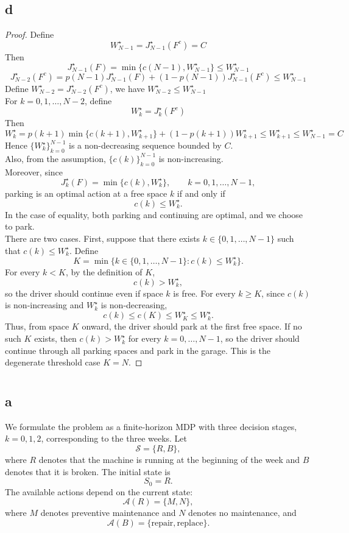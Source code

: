 \documentclass{article}
\begin{document}
\subsection*{d}
\begin{proof}
Define \[W^{\star}_{N-1}=J^{\star}_{N-1}(F^c)=C\]
Then \[J^{\star}_{N-1}(F)=\min \{c(N-1),W^{\star}_{N-1}\} \leq W^{\star}_{N-1}\]
\[J^{\star}_{N-2}(F^c)=p(N-1)J^{\star}_{N-1}(F) + (1-p(N-1)) J^{\star}_{N-1}(F^c)\leq W^{\star} _{N-1}\]
Define $W^{\star}_{N-2}=J^{\star}_{N-2}(F^c)$, we have $W^{\star}_{N-2} \leq W^{\star} _{N-1}$\\
For $k=0,1,\ldots, {N-2}$, define
\[W^{\star}_{k} = J^{\star}_{k}(F^c)\]
Then \[W^{\star}_{k} = p(k+1) \min \{c(k+1), W^{\star}_{k+1}\}+(1-p(k+1))W^{\star}_{k+1} \leq W^{\star}_{k+1}\leq W^{\star}_{N-1}=C\]
Hence $\{W^{\star}_k\}_{k=0}^{N-1}$ is a non-decreasing sequence bounded by $C$.\\
Also, from the assumption, $\{c(k)\}_{k=0}^{N-1}$ is non-increasing.\\
Moreover, since \[J_k^\star(F)=\min\{c(k),W_k^\star\}, \qquad k=0,1,\ldots,N-1,\]
parking is an optimal action at a free space $k$ if and only if
\[c(k)\leq W_k^\star.\]
In the case of equality, both parking and continuing are optimal, and we choose to park.\\
There are two cases. First, suppose that there exists
$k\in\{0,1,\ldots,N-1\}$ such that
$c(k)\leq W_k^\star$. Define
\[K=\min\{k\in\{0,1,\ldots,N-1\}:c(k)\leq W_k^\star\}.\]
For every $k<K$, by the definition of $K$,
\[c(k)>W_k^\star,\]
so the driver should continue even if space $k$ is free.
For every $k\geq K$, since $c(k)$ is non-increasing and
$W_k^\star$ is non-decreasing,
\[c(k)\leq c(K)\leq W_K^\star\leq W_k^\star. \]
Thus, from space $K$ onward, the driver should park at the first free
space.
If no such $K$ exists, then $c(k)>W_k^\star$ for every
$k=0,\ldots,N-1$, so the driver should continue through all parking
spaces and park in the garage. This is the degenerate threshold case $K=N$.
\end{proof}
\section{}
\subsection*{a}
We formulate the problem as a finite-horizon MDP with three decision stages,
$k=0,1,2$, corresponding to the three weeks. Let
\[\mathcal S=\{R,B\},\]
where $R$ denotes that the machine is running at the beginning of the week
and $B$ denotes that it is broken. The initial state is
\[S_0=R.\]
The available actions depend on the current state:
\[\mathcal A(R)=\{M,N\},\]
where $M$ denotes preventive maintenance and $N$ denotes no maintenance, and
\[\mathcal A(B)=\{\text{repair},\text{replace}\}.\]
\end{document}
